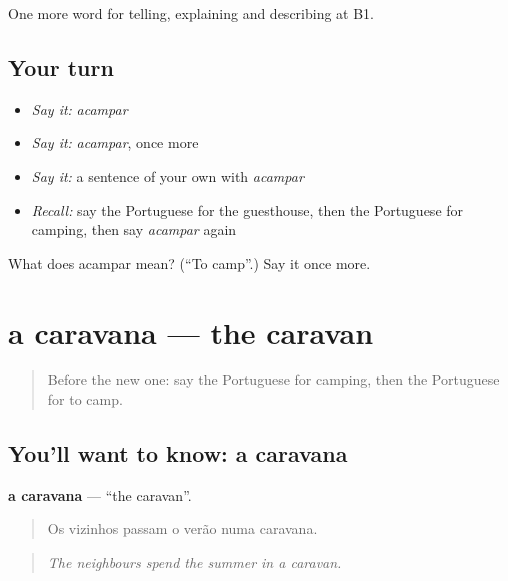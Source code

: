 \begin{grammarlens}[title={What you've built}]
One more word for telling, explaining and describing at B1.
\end{grammarlens}

\subsection*{Your turn}
\begin{itemize}
\raggedright
  \item \emph{Say it:} \emph{acampar}
  \item \emph{Say it:} \emph{acampar}, once more
  \item \emph{Say it:} a sentence of your own with \emph{acampar}
  \item \emph{Recall:} say the Portuguese for the guesthouse, then the Portuguese for camping, then say \emph{acampar} again
\end{itemize}

\begin{tcolorbox}[breakable,colback=teal!4,colframe=teal!35!black,title={Before you move on}]
What does acampar mean? (\textquotedblleft{}To camp\textquotedblright{}.) Say it once more.
\end{tcolorbox}
\section[a caravana]{a caravana — the caravan}

\label{lesson:PT-C426-caravana}



\begin{quote}
Before the new one: say the Portuguese for camping, then the Portuguese for to camp.
\end{quote}

\subsection*{You'll want to know: a caravana}
\textbf{a caravana} — \textquotedblleft{}the caravan\textquotedblright{}.

\begin{quote}
Os vizinhos passam o verão numa caravana.
\end{quote}

\begin{quote}
\emph{The neighbours spend the summer in a caravan.}
\end{quote}

